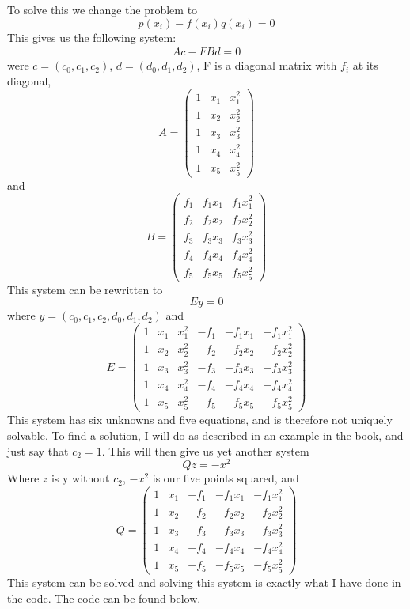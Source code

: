 \documentclass[11pt,a4paper]{report}
\begin{document}
To solve this we change the problem to $$p(x_i)-f(x_i)q(x_i)=0$$ This gives us the following system: 
\begin{align*}
Ac-FBd=0
\end{align*}
were $c=(c_0,c_1,c_2)$,  $d=(d_0,d_1,d_2)$, F is a diagonal matrix with $f_i$ at its diagonal,
$$ 
A = 
 \begin{pmatrix}
  1 & x_1 & x_1^2  \\
  1 & x_2 & x_2^2  \\
  1 & x_3 & x_3^2   \\
  1 & x_4 & x_4^2 \\
  1 & x_5 & x_5^2
 \end{pmatrix}
$$
and 
$$ 
B = 
 \begin{pmatrix}
  f_1 & f_1x_1 & f_1x_1^2  \\
  f_2 & f_2x_2 & f_2x_2^2  \\
  f_3 & f_3x_3 & f_3x_3^2   \\
  f_4 & f_4x_4 & f_4x_4^2 \\
  f_5 & f_5x_5 & f_5x_5^2
 \end{pmatrix}
$$
This system can be rewritten to $$Ey=0$$ where $y = (c_0,c_1,c_2,d_0,d_1,d_2)$ and 
$$
E = 
 \begin{pmatrix}
  1 & x_1 & x_1^2 & -f_1 & -f_1x_1 & -f_1x_1^2  \\
  1 & x_2 & x_2^2 & -f_2 & -f_2x_2 & -f_2x_2^2  \\
  1 & x_3 & x_3^2 & -f_3 & -f_3x_3 & -f_3x_3^2   \\
  1 & x_4 & x_4^2 & -f_4 & -f_4x_4 & -f_4x_4^2 \\
  1 & x_5 & x_5^2 & -f_5 & -f_5x_5 & -f_5x_5^2
 \end{pmatrix}
$$
This system has six unknowns and five equations, and is therefore not uniquely solvable. To find a solution, I will do as described in an example in the book, and just say that $c_2=1$. This will then give us yet another system $$Qz=-x^2$$ Where $z$ is y without $c_2$, $-x^2$ is our five points squared, and 
$$
Q = 
 \begin{pmatrix}
  1 & x_1 &  -f_1 & -f_1x_1 & -f_1x_1^2  \\
  1 & x_2 &  -f_2 & -f_2x_2 & -f_2x_2^2  \\
  1 & x_3 &  -f_3 & -f_3x_3 & -f_3x_3^2   \\
  1 & x_4 &  -f_4 & -f_4x_4 & -f_4x_4^2 \\
  1 & x_5 &  -f_5 & -f_5x_5 & -f_5x_5^2
 \end{pmatrix}
$$
This system can be solved and solving this system is exactly what I have done in the code. The code can be found below.
\end{document}
